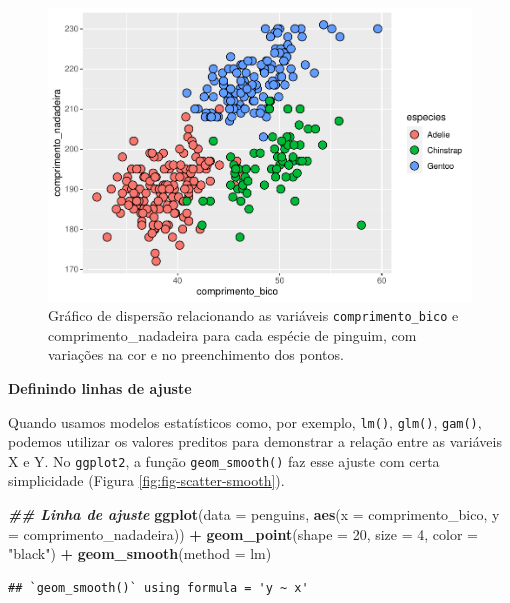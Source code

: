 \documentclass[
]{article}
\newenvironment{Shaded}{\begin{snugshade}}{\end{snugshade}}
\newcommand{\AttributeTok}[1]{\textcolor[rgb]{0.13,0.29,0.53}{#1}}
\newcommand{\DecValTok}[1]{\textcolor[rgb]{0.00,0.00,0.81}{#1}}
\newcommand{\DocumentationTok}[1]{\textcolor[rgb]{0.56,0.35,0.01}{\textbf{\textit{#1}}}}
\newcommand{\FunctionTok}[1]{\textcolor[rgb]{0.13,0.29,0.53}{\textbf{#1}}}
\newcommand{\NormalTok}[1]{#1}
\newcommand{\SpecialCharTok}[1]{\textcolor[rgb]{0.81,0.36,0.00}{\textbf{#1}}}
\newcommand{\StringTok}[1]{\textcolor[rgb]{0.31,0.60,0.02}{#1}}
\begin{document}
\begin{figure}
\centering
\includegraphics{epr_files/figure-latex/fig-scatter-shape-3.pdf}
\caption{\label{fig:fig-scatter-shape-3}Gráfico de dispersão relacionando as variáveis \texttt{comprimento\_bico} e comprimento\_nadadeira para cada espécie de pinguim, com variações na cor e no preenchimento dos pontos.}
\end{figure}

\textbf{Definindo linhas de ajuste}

Quando usamos modelos estatísticos como, por exemplo, \texttt{lm()}, \texttt{glm()}, \texttt{gam()}, podemos utilizar os valores preditos para demonstrar a relação entre as variáveis X e Y. No \texttt{ggplot2}, a função \texttt{geom\_smooth()} faz esse ajuste com certa simplicidade (Figura \ref{fig:fig-scatter-smooth}).

\begin{Shaded}
\begin{Highlighting}[]
\DocumentationTok{\#\# Linha de ajuste}
\FunctionTok{ggplot}\NormalTok{(}\AttributeTok{data =}\NormalTok{ penguins, }\FunctionTok{aes}\NormalTok{(}\AttributeTok{x =}\NormalTok{ comprimento\_bico, }\AttributeTok{y =}\NormalTok{ comprimento\_nadadeira)) }\SpecialCharTok{+}
    \FunctionTok{geom\_point}\NormalTok{(}\AttributeTok{shape =} \DecValTok{20}\NormalTok{, }\AttributeTok{size =} \DecValTok{4}\NormalTok{, }\AttributeTok{color =} \StringTok{"black"}\NormalTok{) }\SpecialCharTok{+}
    \FunctionTok{geom\_smooth}\NormalTok{(}\AttributeTok{method =}\NormalTok{ lm)}
\end{Highlighting}
\end{Shaded}

\begin{verbatim}
## `geom_smooth()` using formula = 'y ~ x'
\end{verbatim}
\end{document}

